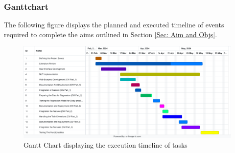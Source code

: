 \subsubsection{Ganttchart}
The following figure displays the planned and executed timeline of events required to complete the aims outlined in Section \ref{Sec: Aim and Objs}.
\begin{figure}[!htbp]
    \centering
    \includegraphics[width=\linewidth]{Diagrams/gant_chart.png}
    \caption{Gantt Chart displaying the execution timeline of tasks}
    \label{Fig: Gantt Chart}
\end{figure}
